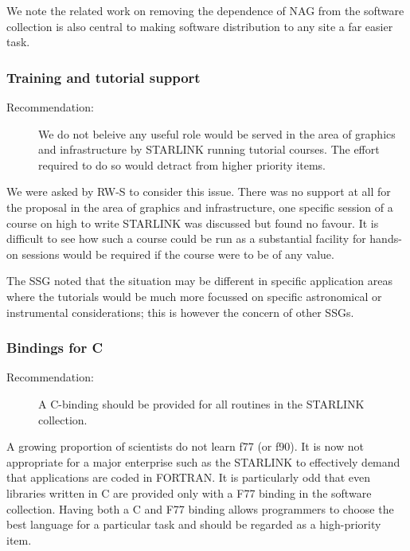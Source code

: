 We note the related work on removing the dependence of NAG from the
software collection is also central to making software distribution to
any site a far easier task.

\subsubsection{\label{infraSSG:training}Training and tutorial support}

\begin{description}
\item[Recommendation:] We do not beleive any useful role would be served in
the area of graphics and infrastructure by STARLINK running tutorial
courses.  The effort required to do so would detract from higher
priority items.
\end{description}

We were asked by RW-S to consider this issue.  There was no support at
all for the proposal in the area of graphics and infrastructure, one
specific session of a course on high to write STARLINK was discussed
but found no favour.  It is difficult to see how such a course could
be run as a substantial facility for hands-on sessions would be
required if the course were to be of any value.

The SSG noted that the situation may be different in specific
application areas where the tutorials would be much more focussed on
specific astronomical or instrumental considerations; this is however
the concern of other SSGs.

\subsubsection{Bindings for C}

\begin{description}
\item[Recommendation:] A C-binding should be provided for all routines in the
STARLINK collection.
\end{description}

A growing proportion of scientists do not learn f77 (or f90).  It is
now not appropriate for a major enterprise such as the STARLINK to
effectively demand that applications are coded in FORTRAN.  It is
particularly odd that even libraries written in C are provided only
with a F77 binding in the software collection.  Having both a C and
F77 binding allows programmers to choose the best language for a
particular task and should be regarded as a high-priority item.

